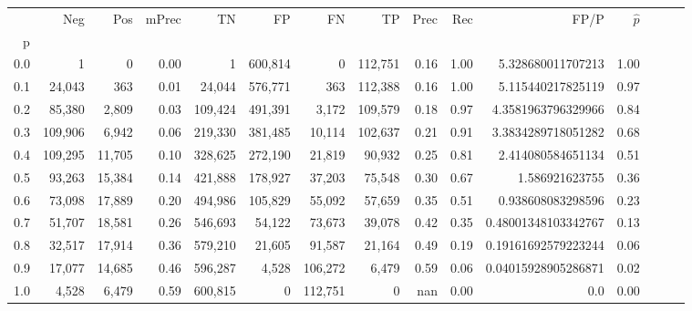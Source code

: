 \begin{tabular}{rrrrrrrrrrrrrrr}
\toprule
{} &      Neg &     Pos & mPrec &       TN &       FP &       FN &       TP &  Prec &   Rec &                 FP/P & $\hat{p}$ \\
p   &          &         &       &          &          &          &          &       &       &                      &           \\
\midrule
0.0 &        1 &       0 &  0.00 &        1 &  600,814 &        0 &  112,751 &  0.16 &  1.00 &    5.328680011707213 &      1.00 \\
0.1 &   24,043 &     363 &  0.01 &   24,044 &  576,771 &      363 &  112,388 &  0.16 &  1.00 &    5.115440217825119 &      0.97 \\
0.2 &   85,380 &   2,809 &  0.03 &  109,424 &  491,391 &    3,172 &  109,579 &  0.18 &  0.97 &   4.3581963796329966 &      0.84 \\
0.3 &  109,906 &   6,942 &  0.06 &  219,330 &  381,485 &   10,114 &  102,637 &  0.21 &  0.91 &   3.3834289718051282 &      0.68 \\
0.4 &  109,295 &  11,705 &  0.10 &  328,625 &  272,190 &   21,819 &   90,932 &  0.25 &  0.81 &    2.414080584651134 &      0.51 \\
0.5 &   93,263 &  15,384 &  0.14 &  421,888 &  178,927 &   37,203 &   75,548 &  0.30 &  0.67 &       1.586921623755 &      0.36 \\
0.6 &   73,098 &  17,889 &  0.20 &  494,986 &  105,829 &   55,092 &   57,659 &  0.35 &  0.51 &    0.938608083298596 &      0.23 \\
0.7 &   51,707 &  18,581 &  0.26 &  546,693 &   54,122 &   73,673 &   39,078 &  0.42 &  0.35 &  0.48001348103342767 &      0.13 \\
0.8 &   32,517 &  17,914 &  0.36 &  579,210 &   21,605 &   91,587 &   21,164 &  0.49 &  0.19 &  0.19161692579223244 &      0.06 \\
0.9 &   17,077 &  14,685 &  0.46 &  596,287 &    4,528 &  106,272 &    6,479 &  0.59 &  0.06 &  0.04015928905286871 &      0.02 \\
1.0 &    4,528 &   6,479 &  0.59 &  600,815 &        0 &  112,751 &        0 &   nan &  0.00 &                  0.0 &      0.00 \\
\bottomrule
\end{tabular}
